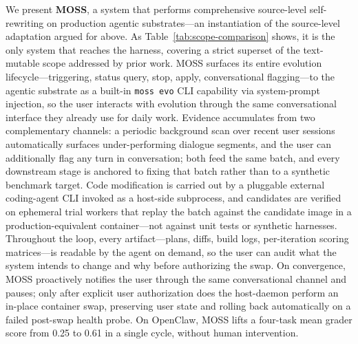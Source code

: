 We present \textbf{MOSS}, a system that performs comprehensive source-level self-rewriting on production agentic substrates---an instantiation of the source-level adaptation argued for above. As Table~\ref{tab:scope-comparison} shows, it is the only system that reaches the harness, covering a strict superset of the text-mutable scope addressed by prior work. MOSS surfaces its entire evolution lifecycle---triggering, status query, stop, apply, conversational flagging---to the agentic substrate as a built-in \texttt{moss evo} CLI capability via system-prompt injection, so the user interacts with evolution through the same conversational interface they already use for daily work. Evidence accumulates from two complementary channels: a periodic background scan over recent user sessions automatically surfaces under-performing dialogue segments, and the user can additionally flag any turn in conversation; both feed the same batch, and every downstream stage is anchored to fixing that batch rather than to a synthetic benchmark target. Code modification is carried out by a pluggable external coding-agent CLI invoked as a host-side subprocess, and candidates are verified on ephemeral trial workers that replay the batch against the candidate image in a production-equivalent container---not against unit tests or synthetic harnesses. Throughout the loop, every artifact---plans, diffs, build logs, per-iteration scoring matrices---is readable by the agent on demand, so the user can audit what the system intends to change and why before authorizing the swap. On convergence, MOSS proactively notifies the user through the same conversational channel and pauses; only after explicit user authorization does the host-daemon perform an in-place container swap, preserving user state and rolling back automatically on a failed post-swap health probe. On OpenClaw, MOSS lifts a four-task mean grader score from 0.25 to 0.61 in a single cycle, without human intervention.

